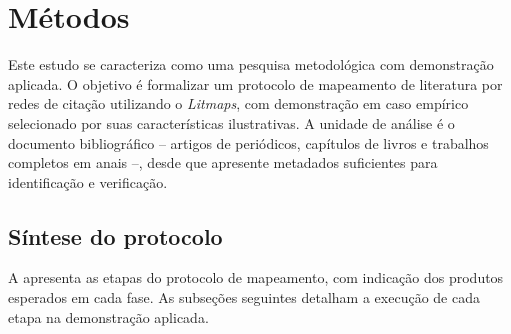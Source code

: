 \documentclass[portuguese]{textolivre}
\begin{document}
\section{Métodos}\label{sec-organizacao}
Este estudo se caracteriza como uma pesquisa metodológica com demonstração aplicada. O objetivo é formalizar um protocolo de mapeamento de literatura por redes de citação utilizando o \textit{Litmaps}, com demonstração em caso empírico selecionado por suas características ilustrativas. A unidade de análise é o documento bibliográfico – artigos de periódicos, capítulos de livros e trabalhos completos em anais –, desde que apresente metadados suficientes para identificação e verificação.

\subsection{Síntese do protocolo}\label{sec-organizacao-latex}
A  apresenta as etapas do protocolo de mapeamento, com indicação dos produtos esperados em cada fase. As subseções seguintes detalham a execução de cada etapa na demonstração aplicada.
\end{document}
